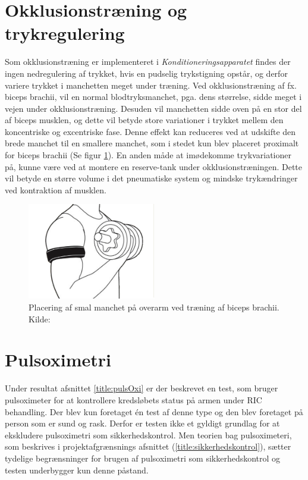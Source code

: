 \section{Okklusionstræning og trykregulering}
Som okklusionstræning er implementeret i \textit{Konditioneringsapparatet} findes der ingen nedregulering af trykket, hvis en pudselig trykstigning opstår, og derfor variere trykket i manchetten meget under træning. Ved okklusionstræning af fx. biceps brachii, vil en normal blodtryksmanchet, pga. dens størrelse, sidde meget i vejen under okklusionstræning. Desuden vil manchetten sidde oven på en stor del af biceps musklen, og dette vil betyde store variationer i trykket mellem den koncentriske og excentriske fase. Denne effekt kan reduceres ved at udskifte den brede manchet til en smallere manchet, som i stedet kun blev placeret proximalt for biceps brachii (Se figur \ref{fig:okklcuff}). En anden måde at imødekomme trykvariationer på, kunne være ved at montere en \textquotedbl reserve-tank\textquotedbl{} under okklusionstræningen. Dette vil betyde en større volume i det pneumatiske system og mindske trykændringer ved kontraktion af musklen. 
\begin{figure}[H]
	\centering
	\includegraphics[trim={1.5cm 0 1.5cm 0}, clip, width=0.5\textwidth]{billeder/okklusionCuff.png}
	\caption{Placering af smal manchet på overarm ved træning af biceps brachii. Kilde: \cite{Billede:3}}\label{fig:okklcuff}
\end{figure}

\section{Pulsoximetri}
Under resultat afsnittet \ref{title:pulsOxi} er der beskrevet en test, som bruger pulsoximeter for at kontrollere kredsløbets status på armen under RIC behandling. Der blev kun foretaget én test af denne type og den blev foretaget på person som er sund og rask. Derfor er testen ikke et gyldigt grundlag for at ekskludere pulsoximetri som sikkerhedskontrol. Men teorien bag pulsoximeteri, som beskrives i projektafgrænsnings afsnittet (\ref{title:sikkerhedskontrol}), sætter tydelige begrænsninger for brugen af pulsoximetri som sikkerhedskontrol og testen underbygger kun denne påstand. 

